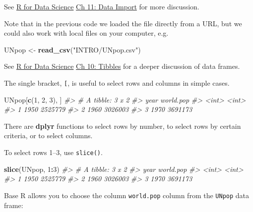 \documentclass[]{book}
\newenvironment{Shaded}{\begin{snugshade}}{\end{snugshade}}
\newcommand{\CommentTok}[1]{\textcolor[rgb]{0.56,0.35,0.01}{\textit{#1}}}
\newcommand{\DecValTok}[1]{\textcolor[rgb]{0.00,0.00,0.81}{#1}}
\newcommand{\KeywordTok}[1]{\textcolor[rgb]{0.13,0.29,0.53}{\textbf{#1}}}
\newcommand{\NormalTok}[1]{#1}
\newcommand{\OperatorTok}[1]{\textcolor[rgb]{0.81,0.36,0.00}{\textbf{#1}}}
\newcommand{\StringTok}[1]{\textcolor[rgb]{0.31,0.60,0.02}{#1}}
\theoremstyle{definition}
\theoremstyle{definition}
\theoremstyle{definition}
\theoremstyle{remark}
\begin{document}
See \href{http://r4ds.had.co.nz/}{R for Data Science}
\href{http://r4ds.had.co.nz/tibbles.html\#introduction-4}{Ch 11: Data
Import} for more discussion.

Note that in the previous code we loaded the file directly from a URL,
but we could also work with local files on your computer, e.g.

\begin{Shaded}
\begin{Highlighting}[]
\NormalTok{UNpop <-}\StringTok{ }\KeywordTok{read_csv}\NormalTok{(}\StringTok{"INTRO/UNpop.csv"}\NormalTok{)}
\end{Highlighting}
\end{Shaded}

See \href{http://r4ds.had.co.nz/}{R for Data Science}
\href{http://r4ds.had.co.nz/tibbles.html}{Ch 10: Tibbles} for a deeper
discussion of data frames.

The single bracket, \texttt{{[}}, is useful to select rows and columns
in simple cases.

\begin{Shaded}
\begin{Highlighting}[]
\NormalTok{UNpop[}\KeywordTok{c}\NormalTok{(}\DecValTok{1}\NormalTok{, }\DecValTok{2}\NormalTok{, }\DecValTok{3}\NormalTok{), ]}
\CommentTok{#> # A tibble: 3 x 2}
\CommentTok{#>    year world.pop}
\CommentTok{#>   <int>     <int>}
\CommentTok{#> 1  1950   2525779}
\CommentTok{#> 2  1960   3026003}
\CommentTok{#> 3  1970   3691173}
\end{Highlighting}
\end{Shaded}

There are \textbf{dplyr} functions to select rows by number, to select
rows by certain criteria, or to select columns.

To select rows 1--3, use \texttt{slice()}.

\begin{Shaded}
\begin{Highlighting}[]
\KeywordTok{slice}\NormalTok{(UNpop, }\DecValTok{1}\OperatorTok{:}\DecValTok{3}\NormalTok{)}
\CommentTok{#> # A tibble: 3 x 2}
\CommentTok{#>    year world.pop}
\CommentTok{#>   <int>     <int>}
\CommentTok{#> 1  1950   2525779}
\CommentTok{#> 2  1960   3026003}
\CommentTok{#> 3  1970   3691173}
\end{Highlighting}
\end{Shaded}

Base R allows you to choose the column \texttt{world.pop} column from
the \texttt{UNpop} data frame:
\end{document}
